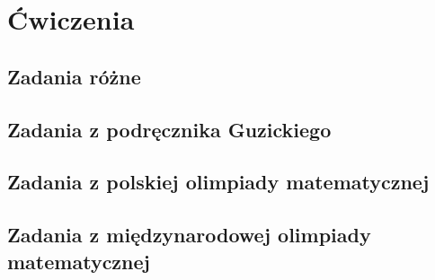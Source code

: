 \documentclass{greaseproof}
\begin{document}
\chapter{Ćwiczenia}
\section{Zadania różne}


\section{Zadania z podręcznika Guzickiego}


\section{Zadania z polskiej olimpiady matematycznej}


\section{Zadania z międzynarodowej olimpiady matematycznej}



{}


\raggedright
{}
\printindex

\printindex[persons]
\end{document}
